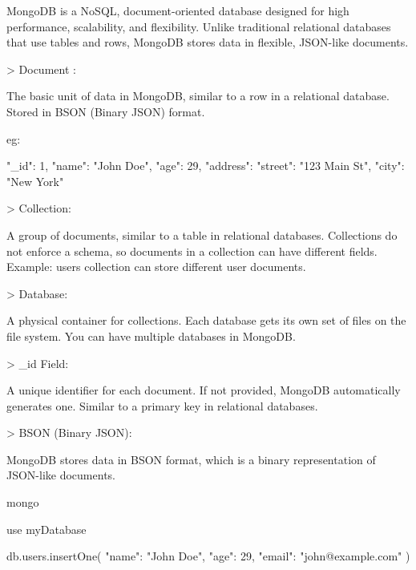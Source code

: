 
MongoDB is a NoSQL, document-oriented database designed for high performance, scalability,
and flexibility. Unlike traditional relational databases that use tables and rows, 
MongoDB stores data in flexible, JSON-like documents.



> Document :

The basic unit of data in MongoDB, similar to a row in a relational database.
Stored in BSON (Binary JSON) format.

eg:

{
  "_id": 1,
  "name": "John Doe",
  "age": 29,
  "address": {
    "street": "123 Main St",
    "city": "New York"
  }
}

>  Collection:

A group of documents, similar to a table in relational databases.
Collections do not enforce a schema, so documents in a collection can have different fields.
Example: users collection can store different user documents.

>  Database:

A physical container for collections. Each database gets its own set of files on the file system.
You can have multiple databases in MongoDB.

>  _id Field:

A unique identifier for each document. If not provided, MongoDB automatically generates one.
Similar to a primary key in relational databases.

> BSON (Binary JSON):

MongoDB stores data in BSON format, which is a binary representation of JSON-like documents.



mongo

use myDatabase



db.users.insertOne({
  "name": "John Doe",
  "age": 29,
  "email": "john@example.com"
})



